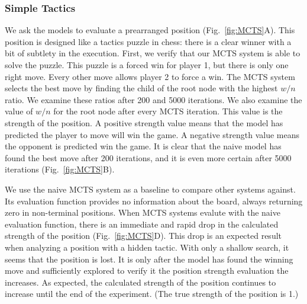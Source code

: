 \documentclass[10pt]{article}
\begin{document}
\subsubsection{Simple Tactics}
We ask the models to evaluate a prearranged position (Fig.~\ref{fig:MCTS}A). This position is designed like a tactics puzzle in chess: there is a clear winner with a bit of subtlety in the execution. First, we verify that our MCTS system is able to solve the puzzle. This puzzle is a forced win for player 1, but there is only one right move. Every other move allows player 2 to force a win. The MCTS system selects the best move by finding the child of the root node with the highest $w / n$ ratio. We examine these ratios after 200 and 5000 iterations. We also examine the value of $w / n$ for the root node after every MCTS iteration. This value is the strength of the position. A positive strength value means that the model has predicted the player to move will win the game. A negative strength value means the opponent is predicted win the game. It is clear that the naive model has found the best move after 200 iterations, and it is even more certain after 5000 iterations (Fig.~\ref{fig:MCTS}B).

We use the naive MCTS system as a baseline to compare other systems against. Its evaluation function provides no information about the board, always returning zero in non-terminal positions. When MCTS systems evalute with the naive evaluation function, there is an immediate and rapid drop in the calculated strength of the position (Fig.~\ref{fig:MCTS}D). This drop is an expected result when analyzing a position with a hidden tactic. With only a shallow search, it seems that the position is lost. It is only after the model has found the winning move and sufficiently explored to verify it the position strength evaluation the increases. As expected, the calculated strength of the position continues to increase until the end of the experiment. (The true strength of the position is 1.)
\end{document}
